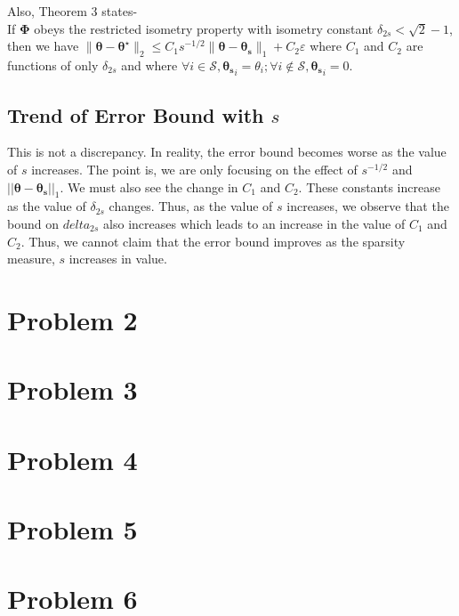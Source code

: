 \documentclass[a4paper,11pt]{article}
\numberwithin{definition}{section}
\numberwithin{mytheorem}{subsection}
\begin{document}
Also, Theorem 3 states-\\If $\boldsymbol{\Phi}$ obeys the restricted isometry property with isometry constant $\delta_{2s} < \sqrt{2}-1$, then we have $\|\boldsymbol{\theta} - \boldsymbol{\theta^{\star}}\|_2 \leq C_1 s^{-1/2}\|\boldsymbol{\theta}-\boldsymbol{\theta_s}\|_1 + C_2 \varepsilon$ where $C_1$ and $C_2$ are functions of only $\delta_{2s}$ and where $\forall i \in \mathcal{S}, \boldsymbol{\theta_s}_i = \theta_i; \forall i \notin \mathcal{S}, \boldsymbol{\theta_s}_i = 0$.

\subsection{Trend of Error Bound with $s$}
This is not a discrepancy. In reality, the error bound becomes worse as the value of $s$ increases. The point is, we are only focusing on the effect of $s^{-1/2}$ and $||\boldsymbol{\theta}-\boldsymbol{\theta_s}||_1$. We must also see the change in $C_1$ and $C_2$. These constants increase as the value of $\delta_{2s}$ changes. Thus, as the value of $s$ increases, we observe that the bound on $delta_{2s}$ also increases which leads to an increase in the value of $C_1$ and $C_2$. Thus, we cannot claim that the error bound improves as the sparsity measure, $s$ increases in value.


\section{Problem 2}
\section{Problem 3}
\section{Problem 4}
\section{Problem 5}
\section{Problem 6}
\end{document}
